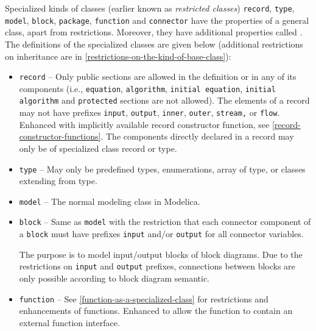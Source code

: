 Specialized kinds of classes (earlier known as \emph{restricted classes})
\lstinline!record!, \lstinline!type!, \lstinline!model!, \lstinline!block!, \lstinline!package!, \lstinline!function! and \lstinline!connector!
have the properties of a general class, apart from restrictions.
Moreover, they have additional properties called . The definitions of the specialized classes are given below
(additional restrictions on inheritance are in \cref{restrictions-on-the-kind-of-base-class}):
\begin{itemize}
\item \lstinline!record! --
Only public sections are allowed in the definition or in any of its components (i.e., \lstinline!equation!, \lstinline!algorithm!, \lstinline!initial equation!, \lstinline!initial algorithm! and \lstinline!protected! sections are not allowed).  The elements of a record may not have prefixes \lstinline!input!, \lstinline!output!, \lstinline!inner!, \lstinline!outer!, \lstinline!stream,! or \lstinline!flow!.  Enhanced with implicitly available record constructor function, see \cref{record-constructor-functions}.  The components directly declared in a record may only be of specialized class record or type.

\item \lstinline!type! --
May only be predefined types, enumerations, array of type, or classes extending from type.

\item \lstinline!model! --
The normal modeling class in Modelica.

\item \lstinline!block! --
Same as \lstinline!model! with the restriction that each connector component of a \lstinline!block! must have prefixes \lstinline!input! and/or \lstinline!output! for all connector variables.

\begin{nonnormative}
The purpose is to model input/output blocks of block diagrams.  Due to the restrictions on \lstinline!input! and \lstinline!output! prefixes,
connections between blocks are only possible according to block diagram semantic.
\end{nonnormative}

\item \lstinline!function! --
See \cref{function-as-a-specialized-class} for restrictions and enhancements of functions. Enhanced to allow the function to contain an external function interface.


\end{itemize}
